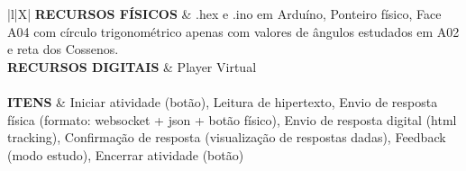 \begin{xltabular}{\textwidth}{|l|X|}
	\textbf{RECURSOS FÍSICOS} & .hex e .ino em Arduíno, Ponteiro físico, Face A04 com círculo trigonométrico apenas com valores de ângulos estudados em A02 e reta dos Cossenos.  \\ \hline
	\textbf{RECURSOS DIGITAIS} & Player Virtual \\ \hline		
	 \\ \hline
	\textbf{ITENS} & Iniciar atividade (botão), Leitura de hipertexto, Envio de resposta física (formato: websocket + json + botão físico), Envio de resposta digital (html tracking), Confirmação de resposta (visualização de respostas dadas), Feedback (modo estudo), Encerrar atividade (botão)  \\ \hline
	
\end{xltabular}

